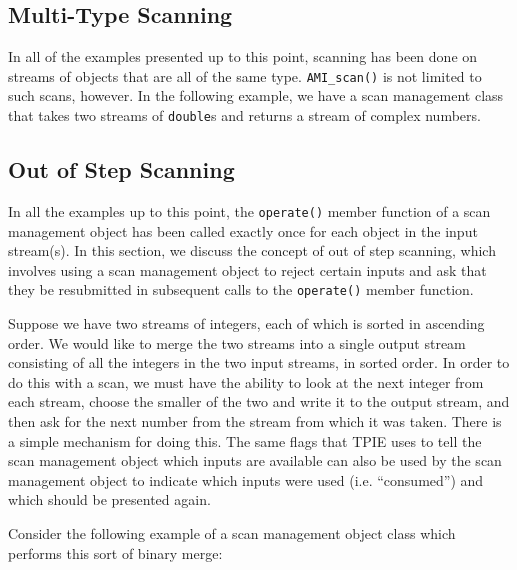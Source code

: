 \subsection{Multi-Type Scanning}


In all of the examples presented up to this point, scanning
has been done on streams of objects that are all of the same
type.  \lstinline|AMI_scan()| is not limited to such scans,
however.  In the following example, we have a scan
management class that takes two streams of \lstinline|double|s
and returns a stream of complex numbers.



\subsection{Out of Step Scanning}

 In all the examples up to this point,
the \lstinline|operate()| member function of a scan management object has
been called exactly once for each object in the input stream(s).  In
this section, we discuss the concept of out of step scanning, which
involves using a scan management object to reject certain inputs and
ask that they be resubmitted in subsequent calls to the
\lstinline|operate()| member function.

Suppose we have two streams of integers, each of which is
sorted in ascending order.  We would like to merge the two streams
into a single output stream consisting of all the integers in the two
input streams, in sorted order.  In order to do this with a scan, we
must have the ability to look at the next integer from each stream,
choose the smaller of the two and write it to the output stream, and
then ask for the next number from the stream from which it was taken.
There is a simple mechanism for doing this.  The same flags
that TPIE uses to tell the scan management object which inputs are
available can also be used by the scan management object to indicate which
inputs were used (i.e. ``consumed'') and which should be presented again.

Consider the following example of a scan management object class which
performs this sort of binary
merge:



